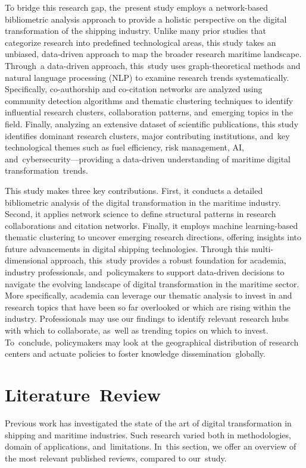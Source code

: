 \documentclass[jmse,review,accept,pdftex,moreauthors]{Definitions/mdpi}
\begin{document}
To bridge this research gap, the~present study employs a network-based bibliometric analysis approach to provide a holistic perspective on the digital transformation of the shipping industry. Unlike many prior studies that categorize research into predefined technological areas, this study takes an unbiased, data-driven approach to map the broader research maritime landscape. Through~a data-driven approach, this~study uses graph-theoretical methods and natural language processing (NLP) to examine research trends systematically. Specifically, co-authorship and co-citation networks are analyzed using community detection algorithms and thematic clustering techniques to identify influential research clusters, collaboration patterns, and~emerging topics in the field. Finally, analyzing an extensive dataset of scientific publications, this study identifies dominant research clusters, major contributing institutions, and~key technological themes such as fuel efficiency, risk management, AI, and~cybersecurity—providing a data-driven understanding of maritime digital transformation~trends.

This study makes three key contributions. First, it conducts a detailed bibliometric analysis of the digital transformation in the maritime industry. Second, it applies network science to define structural patterns in research collaborations and citation networks. Finally, it employs machine learning-based thematic clustering to uncover emerging research directions, offering insights into future advancements in digital shipping technologies. Through this multi-dimensional approach, this~study provides a robust foundation for academia, industry professionals, and~policymakers to support data-driven decisions to navigate the evolving landscape of digital transformation in the maritime sector. More specifically, academia can leverage our thematic analysis to invest in and research topics that have been so far overlooked or which are rising within the industry. Professionals may use our findings to identify relevant research hubs with which to collaborate, as~well as trending topics on which to invest. To~conclude, policymakers may look at the geographical distribution of research centers and actuate policies to foster knowledge dissemination~globally.  

\section{Literature~Review}
Previous work has investigated the state of the art of digital transformation in shipping and maritime industries. Such research varied both in methodologies, domain of applications, and~limitations. In~this section, we offer an overview of the most relevant published reviews, compared to our~study.
\end{document}
